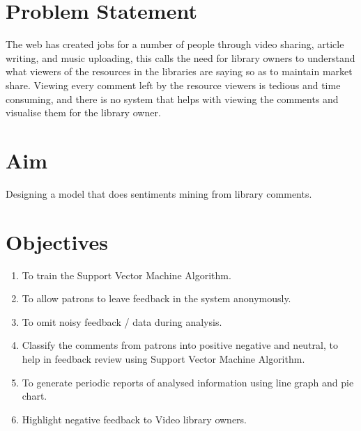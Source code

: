 \documentclass[12pt]{report}
\begin{document}
	\section{Problem Statement}
	The web has created jobs for a number of people through video sharing, article writing, and music uploading, this calls the need for library owners to understand what viewers of the resources in the libraries are saying so as to maintain market share. Viewing every comment left by the resource viewers is tedious and time consuming, and there is no system that helps with viewing the comments and visualise them for the library owner. 
	\section{Aim}
	Designing a model that does sentiments mining from library comments.
	\section{Objectives}
	\begin{enumerate}
				
		\item To train the Support Vector Machine Algorithm.
		\item To allow patrons to leave feedback in the system anonymously.
		\item To omit noisy feedback / data during analysis.
		\item  Classify the comments from patrons into positive negative and neutral, to help in feedback review using Support Vector Machine Algorithm.
		\item To generate periodic reports of analysed information using line graph and pie chart.
		\item Highlight negative feedback to Video library owners.
				
	\end{enumerate}
	
	
\end{document}
